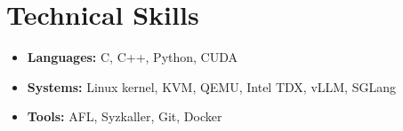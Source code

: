 \section{Technical Skills}

\begin{itemize}
  \item \textbf{Languages:} C, C++, Python, CUDA
  \item \textbf{Systems:} Linux kernel, KVM, QEMU, Intel TDX, vLLM, SGLang
  \item \textbf{Tools:} AFL, Syzkaller, Git, Docker
\end{itemize}

